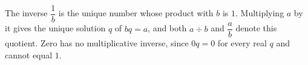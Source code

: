 The inverse $\dfrac{1}{b}$ is the unique number whose product with $b$ is $1$. Multiplying $a$ by it gives the unique solution $q$ of $bq=a$, and both $a\div b$ and $\dfrac{a}{b}$ denote this quotient. Zero has no multiplicative inverse, since $0q=0$ for every real $q$ and cannot equal $1$.
